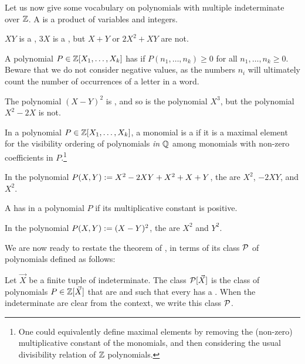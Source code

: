 \documentclass[a4paper,11pt]{article}
\begin{document}
\AP Let us now give some vocabulary on polynomials with multiple indeterminate
over $\mathbb{Z}$. 
A  is a product of variables and integers.
\begin{example}
    $XY$ is a , $3 X$ is a , 
    but $X + Y$ or $2X^2 + XY$ are not.
\end{example}
A polynomial $P \in \mathbb{Z}[X_1, \dots, X_k]$ has 
if $P(n_1, \dots, n_k) \geq 0$ for all $n_1, \dots, n_k \geq 0$. Beware that we
do not consider negative values, as the numbers $n_i$ will ultimately count the
number of occurrences of a letter in a word.
\begin{example}
    The polynomial $(X - Y)^2$ is ,
    and so is the polynomial $X^3$, but the polynomial
    $X^2 - 2X$ is not.
\end{example}
In a polynomial $P \in \mathbb{Z}[X_1, \dots, X_k]$, a monomial 
is a  if it is a maximal element
for the visibility ordering of polynomials \emph{in $\mathbb{Q}$}
among monomials with non-zero coefficients in $P$.\footnote{
    One could equivalently define maximal elements by removing the (non-zero)
    multiplicative constant of the monomials, and then
    considering the usual divisibility relation of $\mathbb{Z}$ polynomials.
}
\begin{example}
    In the polynomial 
    $P(X,Y) \mathrel{:=} X^2 - 2XY + X^2 + X + Y$, the 
    are $X^2$, $-2 XY$, and $X^2$.
\end{example}
A  has  in a polynomial $P$
if its multiplicative constant is positive.
\begin{example}
    In the polynomial $P(X,Y) \mathrel{:=} (X - Y)^2$, 
    the  are
    $X^2$ and $Y^2$.
\end{example}

We are now ready to restate the theorem
of \citeauthor{KARH77}, in terms of its
class $\mathcal{P}$ of polynomials defined as follows:
\begin{definition}
    Let $\vec{X}$ be a finite tuple of indeterminate.
    The class $\mathcal{P}[\vec{X}]$
    is the class of polynomials $P \in \mathbb{Z}[\vec{X}]$
    that are 
    and such that every  has a .
    When the indeterminate are clear from the context, we write
    this class $\mathcal{P}$.
\end{definition}
\end{document}
